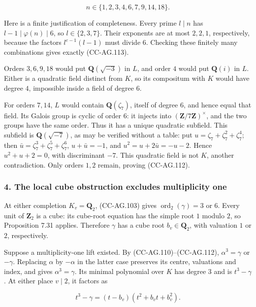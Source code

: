 \[
 n\in\{1,2,3,4,6,7,9,14,18\}.
 \tag{CC-AG.113}
\]

Here is a finite justification of completeness. Every prime \(l\mid n\)
has \(l-1\mid\varphi(n)\mid6\), so \(l\in\{2,3,7\}\). Their exponents
are at most \(2,2,1\), respectively, because the factors
\(l^{e-1}(l-1)\) must divide \(6\). Checking these finitely many
combinations gives exactly (CC-AG.113).

Orders \(3,6,9,18\) would put \(\mathbf Q(\sqrt{-3})\) in \(L\), and
order \(4\) would put \(\mathbf Q(i)\) in \(L\). Either is a quadratic
field distinct from \(K\), so its compositum with \(K\) would have
degree \(4\), impossible inside a field of degree \(6\).

For orders \(7,14\), \(L\) would contain \(\mathbf Q(\zeta_7)\), itself
of degree \(6\), and hence equal that field. Its Galois group is cyclic
of order \(6\): it injects into \((\mathbf Z/7\mathbf Z)^\times\), and
the two groups have the same order. Thus it has a unique quadratic
subfield. This subfield is \(\mathbf Q(\sqrt{-7})\), as may be verified
without a table: put \(u=\zeta_7+\zeta_7^2+\zeta_7^4\); then
\(\bar u=\zeta_7^3+\zeta_7^5+\zeta_7^6\), \(u+\bar u=-1\), and
\(u^2=u+2\bar u=-u-2\). Hence \(u^2+u+2=0\), with discriminant \(-7\).
This quadratic field is not \(K\), another contradiction. Only orders
\(1,2\) remain, proving (CC-AG.112).

\subsubsection{4. The local cube obstruction excludes multiplicity
one}\label{the-local-cube-obstruction-excludes-multiplicity-one}

At either completion \(K_v=\mathbf Q_2\), (CC-AG.103) gives
\(\operatorname{ord}_2(\gamma)=3\) or \(6\). Every unit of
\(\mathbf Z_2\) is a cube: its cube-root equation has the simple root
\(1\) modulo \(2\), so Proposition 7.31 applies. Therefore \(\gamma\)
has a cube root \(b_v\in\mathbf Q_2\), with valuation \(1\) or \(2\),
respectively.

Suppose a multiplicity-one lift existed. By (CC-AG.110)--(CC-AG.112),
\(\alpha^3=\gamma\) or \(-\gamma\). Replacing \(\alpha\) by \(-\alpha\)
in the latter case preserves its centre, valuations and index, and gives
\(\alpha^3=\gamma\). Its minimal polynomial over \(K\) has degree \(3\)
and is \(t^3-\gamma\). At either place \(v\mid2\), it factors as

\[
 t^3-\gamma=(t-b_v)(t^2+b_vt+b_v^2).
 \tag{CC-AG.114}
\]

